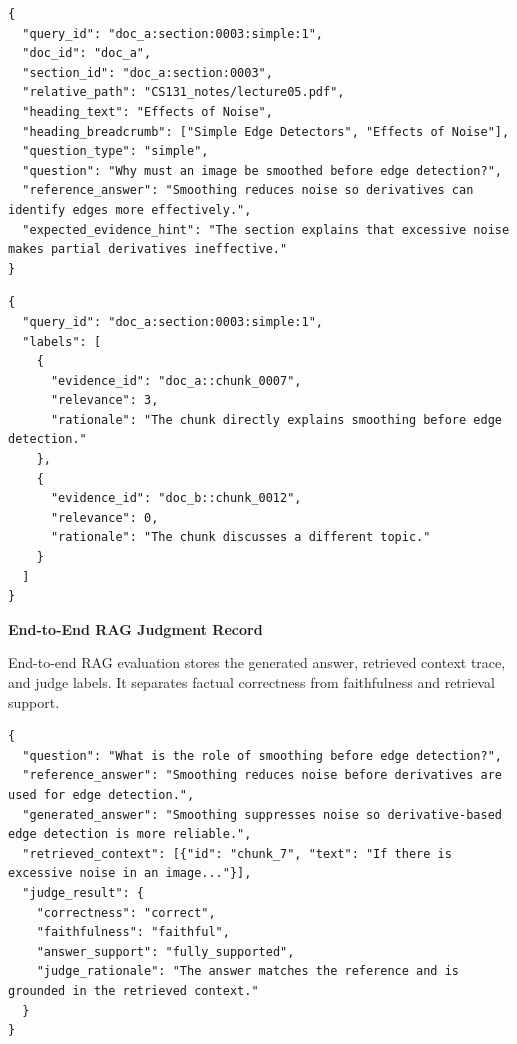 \begin{lstlisting}[style=jsonappendix,caption={PDF retrieval generated-question record},label={lst:retrieval_question_format}]
{
  "query_id": "doc_a:section:0003:simple:1",
  "doc_id": "doc_a",
  "section_id": "doc_a:section:0003",
  "relative_path": "CS131_notes/lecture05.pdf",
  "heading_text": "Effects of Noise",
  "heading_breadcrumb": ["Simple Edge Detectors", "Effects of Noise"],
  "question_type": "simple",
  "question": "Why must an image be smoothed before edge detection?",
  "reference_answer": "Smoothing reduces noise so derivatives can identify edges more effectively.",
  "expected_evidence_hint": "The section explains that excessive noise makes partial derivatives ineffective."
}
\end{lstlisting}

\begin{lstlisting}[style=jsonappendix,caption={PDF retrieval relevance-judgment format},label={lst:retrieval_judgment_format}]
{
  "query_id": "doc_a:section:0003:simple:1",
  "labels": [
    {
      "evidence_id": "doc_a::chunk_0007",
      "relevance": 3,
      "rationale": "The chunk directly explains smoothing before edge detection."
    },
    {
      "evidence_id": "doc_b::chunk_0012",
      "relevance": 0,
      "rationale": "The chunk discusses a different topic."
    }
  ]
}
\end{lstlisting}

\textbf{End-to-End RAG Judgment Record}

End-to-end RAG evaluation stores the generated answer, retrieved context trace, and judge labels. It separates factual correctness from faithfulness and retrieval support.

\begin{lstlisting}[style=jsonappendix,caption={End-to-end RAG judge result format},label={lst:e2e_judgment_format}]
{
  "question": "What is the role of smoothing before edge detection?",
  "reference_answer": "Smoothing reduces noise before derivatives are used for edge detection.",
  "generated_answer": "Smoothing suppresses noise so derivative-based edge detection is more reliable.",
  "retrieved_context": [{"id": "chunk_7", "text": "If there is excessive noise in an image..."}],
  "judge_result": {
    "correctness": "correct",
    "faithfulness": "faithful",
    "answer_support": "fully_supported",
    "judge_rationale": "The answer matches the reference and is grounded in the retrieved context."
  }
}
\end{lstlisting}

